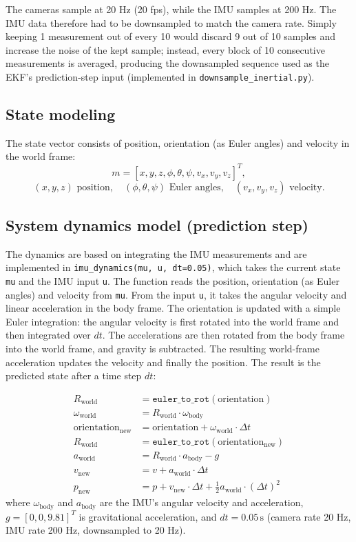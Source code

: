 \documentclass[11pt]{article}
\begin{document}
The cameras sample at 20 Hz (20 fps), while the IMU samples at 200 Hz. The IMU data therefore had to
be downsampled to match the camera rate. Simply keeping 1 measurement out of every 10 would discard
9 out of 10 samples and increase the noise of the kept sample; instead, every block of 10 consecutive
measurements is averaged, producing the downsampled sequence used as the EKF's prediction-step input
(implemented in \texttt{downsample\_inertial.py}).

\subsection{State modeling}
The state vector consists of position, orientation (as Euler angles) and velocity in the world frame:
\[
m = [x,y,z,\phi,\theta,\psi,v_x,v_y,v_z]^T,
\]
\[
(x,y,z) \text{ position}, \quad (\phi,\theta,\psi) \text{ Euler angles}, \quad (v_x,v_y,v_z) \text{ velocity}.
\]

\subsection{System dynamics model (prediction step)}
\begin{sloppypar}
The dynamics are based on integrating the IMU measurements and are implemented in
\texttt{imu\_dynamics(\allowbreak mu,\allowbreak\ u,\allowbreak\ dt{=}0.05)}, which takes the current state \texttt{mu} and the IMU input
\texttt{u}. The function reads the position, orientation (as Euler angles) and velocity from \texttt{mu}.
From the input \texttt{u}, it takes the angular velocity and linear acceleration in the body frame.
The orientation is updated with a simple Euler integration: the angular velocity is first rotated into
the world frame and then integrated over $dt$. The accelerations are then rotated from the body frame
into the world frame, and gravity is subtracted. The resulting world-frame acceleration updates the
velocity and finally the position. The result is the predicted state after a time step $dt$:
\end{sloppypar}
\begin{align}
R_{\text{world}} &= \texttt{euler\_to\_rot}(\text{orientation})\\
\omega_{\text{world}} &= R_{\text{world}} \cdot \omega_{\text{body}}\\
\text{orientation}_{\text{new}} &= \text{orientation} + \omega_{\text{world}} \cdot \Delta t\\
R_{\text{world}} &= \texttt{euler\_to\_rot}(\text{orientation}_{\text{new}})\\
a_{\text{world}} &= R_{\text{world}} \cdot a_{\text{body}} - g\\
v_{\text{new}} &= v + a_{\text{world}} \cdot \Delta t\\
p_{\text{new}} &= p + v_{\text{new}} \cdot \Delta t + \tfrac{1}{2} a_{\text{world}} \cdot (\Delta t)^2
\end{align}
where $\omega_{\text{body}}$ and $a_{\text{body}}$ are the IMU's angular velocity and acceleration,
$g = [0,0,9.81]^T$ is gravitational acceleration, and $dt = 0.05\,\mathrm{s}$ (camera rate 20 Hz, IMU
rate 200 Hz, downsampled to 20 Hz).
\end{document}
